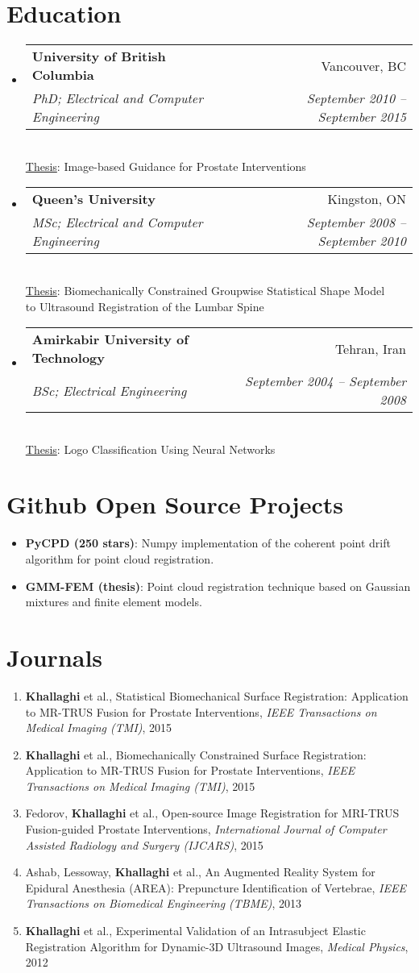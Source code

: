 \documentclass[letterpaper,11pt]{article}
\makeatletter
\newcommand{\resumeItem}[2]{
  \item\small{
    \textbf{#1}{: #2 \vspace{-2pt}}
  }
}
\newcommand{\publicationItem}[4]{
  \item\small{
    {#1}{ et al., #2}{, \textit{#3}}{, #4}
  }
}
\newcommand{\educationSubheading}[5]{
  \vspace{-1pt}\item
    \begin{tabular*}{0.97\textwidth}[t]{l@{\extracolsep{\fill}}r}
      \textbf{#1} & #2 \\
      \textit{\small#3} & \textit{\small #4} \\
    \end{tabular*}\vspace{-5pt} \\\vspace{4pt}\underline{\small Thesis}: \small #5
}
\newcommand{\publicationSubheadingListStart}{\begin{enumerate}[leftmargin=*]}
\newcommand{\publicationSubheadingListEnd}{\end{enumerate}}
\newcommand{\publicationSubItem}[4]{\publicationItem{#1}{#2}{#3}{#4}\vspace{-4pt}}
\newcommand{\resumeSubItem}[2]{\resumeItem{#1}{#2}\vspace{-4pt}}
\newcommand{\resumeSubHeadingListStart}{\begin{itemize}[leftmargin=*]}
\newcommand{\resumeSubHeadingListEnd}{\end{itemize}}
\makeatother
\begin{document}
\section{Education}
  \resumeSubHeadingListStart
    \educationSubheading
      {University of British Columbia}{Vancouver, BC}
      {PhD; Electrical and Computer Engineering}{September 2010 -- September 2015}
      {Image-based Guidance for Prostate Interventions}
    \educationSubheading
      {Queen's University}{Kingston, ON}
      {MSc; Electrical and Computer Engineering}{September 2008 -- September 2010}
      {Biomechanically Constrained Groupwise Statistical Shape Model\\to Ultrasound Registration of the Lumbar Spine}
    \educationSubheading
      {Amirkabir University of Technology}{Tehran, Iran}
      {BSc; Electrical Engineering}{September 2004 -- September 2008}
      {Logo Classification Using Neural Networks}
  \resumeSubHeadingListEnd

\section{Github Open Source Projects}
  \resumeSubHeadingListStart
   \resumeSubItem{PyCPD (250 stars)}
     {Numpy implementation of the coherent point drift algorithm for point cloud registration.}
   \resumeSubItem{GMM-FEM (thesis)}
       {Point cloud registration technique based on Gaussian mixtures and finite element models.}
  \resumeSubHeadingListEnd

\section{Journals}
  \publicationSubheadingListStart
    \publicationSubItem{\textbf{Khallaghi}}
      {Statistical Biomechanical Surface Registration: Application to MR-TRUS Fusion for Prostate Interventions}
      {IEEE Transactions on Medical Imaging (TMI)}{2015}
    \publicationSubItem{\textbf{Khallaghi}}
      {Biomechanically Constrained Surface Registration: Application to MR-TRUS Fusion for Prostate Interventions}
      {IEEE Transactions on Medical Imaging (TMI)}{2015}
    \publicationSubItem {Fedorov, \textbf{Khallaghi}}
      {Open-source Image Registration for MRI-TRUS Fusion-guided Prostate Interventions}
      {International Journal of Computer Assisted Radiology and Surgery (IJCARS)}{2015}
    \publicationSubItem{Ashab, Lessoway, \textbf{Khallaghi}}
      {An Augmented Reality System for Epidural Anesthesia (AREA): Prepuncture Identification of Vertebrae}
      {IEEE Transactions on Biomedical Engineering (TBME)}{2013}
    \publicationSubItem{\textbf{Khallaghi}}
      {Experimental Validation of an Intrasubject Elastic Registration Algorithm for Dynamic-3D Ultrasound Images}
      {Medical Physics}{2012}
  \publicationSubheadingListEnd
\end{document}

